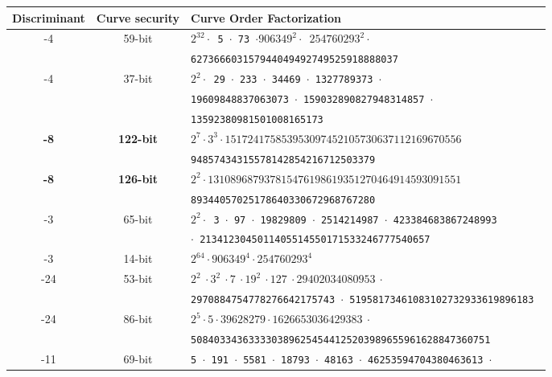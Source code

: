 \documentclass{amsart}
\begin{document}
\begin{table*}[ht]
    \centering\footnotesize
    \begin{tabularx}{\textwidth}{ccl}
        \toprule
                            
        \textbf{Discriminant}    & \textbf{Curve security}  & \textbf{Curve Order Factorization} \\
        \midrule
        -4  &  59-bit & \tt $2^{32} \cdot$ 5 $\cdot$  73 $\cdot 906349^{2} \cdot$ $254760293^{2} \cdot$ \\
                              	&   & \tt  627366603157944049492749525918888037 \\
        -4  &  37-bit & \tt $2^{2} \cdot$ 29 $\cdot$ 233 $\cdot$ 34469 $\cdot$ 1327789373 $\cdot$  \\
         			&   & \tt  19609848837063073 $\cdot$ 159032890827948314857 $\cdot$  \\
                              	&   & \tt  13592380981501008165173 \\
        \textbf{-8}  &   \textbf{122-bit} & \tt $2^{7} \cdot 3^{3} \cdot 151724175853953097452105730637112169670556$ \\
                              	&   & \tt   94857434315578142854216712503379 \\
       	\textbf{-8} &   \textbf{126-bit} & \tt $2^{2} \cdot 131089687937815476198619351270464914593091551$  \\
                              	&   & \tt  89344057025178640330672968767280 \\                              
        -3  &   65-bit & \tt $2^{2} \cdot$ 3 $\cdot$ 97 $\cdot$ 19829809 $\cdot$ 2514214987 $\cdot$ 423384683867248993 \\
                              	&   & \tt  $\cdot$ 2134123045011405514550171533246777540657  \\
        -3  &  14-bit & \tt $2^{64} \cdot 906349^{4} \cdot 254760293^{4}$  \\
        -24  &  53-bit & \tt $2^2 ~ \cdot 3^2 ~ \cdot 7 ~ \cdot 19^2 ~ \cdot 127 ~ \cdot 29402034080953  ~ \cdot $  \\
         			&   & \tt  2970884754778276642175743  $\cdot$ 51958173461083102732933619896183  \\    
        -24  &  86-bit & \tt $2^5 \cdot 5 \cdot 39628279 \cdot 1626653036429383 ~ \cdot$  \\
         			&   & \tt  5084033436333303896254544125203989655961628847360751  \\    
        -11  &  69-bit & \tt 5 $\cdot$ 191 $\cdot$ 5581 $\cdot$ 18793 $\cdot$ 48163 $\cdot$ 46253594704380463613 $\cdot$  \\

\end{tabularx}
\end{table*}
\end{document}
